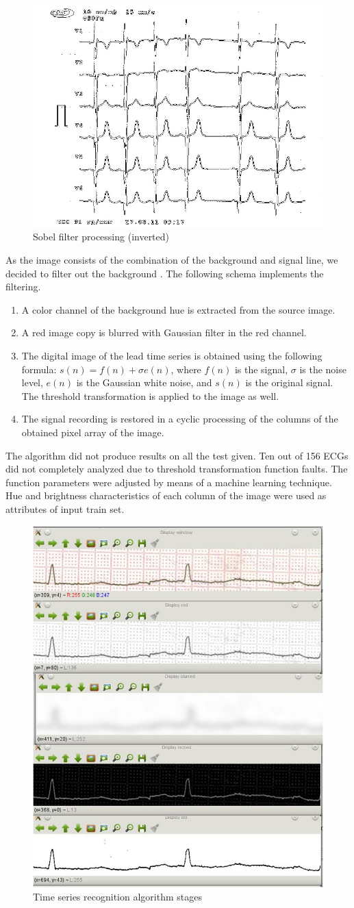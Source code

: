 \documentclass[runningheads]{AIIT}
\begin{document}
\begin{figure}[htb]
  \centering
    \includegraphics[width=0.5\linewidth] {images/Sobel.jpg}
  \caption{Sobel filter processing (inverted)}
  \label{fig:sobel-ex}
\end{figure}

As the image consists of the combination of the background and signal line, we decided to filter out the background \cite{gonseles}.  The following schema implements the filtering.
\begin{enumerate}
\item A color channel of the background hue is extracted from the source image.
\item A red image copy is blurred with Gaussian filter in the red channel.
\item The digital image of the lead time series is obtained using the following formula:
  $s(n)=f(n)+\sigma e(n)$, where $f(n)$ is the signal, $\sigma$ is the
  noise level, $e(n)$ is the Gaussian white noise, and $s(n)$ is the original
  signal.  The threshold transformation is applied to the image as well.
\item The signal recording is restored in a cyclic processing of the columns of the obtained pixel array of the image.
\end{enumerate}
The algorithm did not produce results on all the test given.  Ten out of 156 ECGs did not completely analyzed due to threshold transformation function faults.  The function parameters were adjusted by means of a machine learning technique.  Hue and brightness characteristics of each column of the image were used as attributes of input train set.

\begin{figure}[htb]
  \centering
    \includegraphics[width=0.5\linewidth] {images/Algorithm.jpg}
  \caption{Time series recognition algorithm stages}
  \label{fig:leads-ex}
\end{figure}
\end{document}
